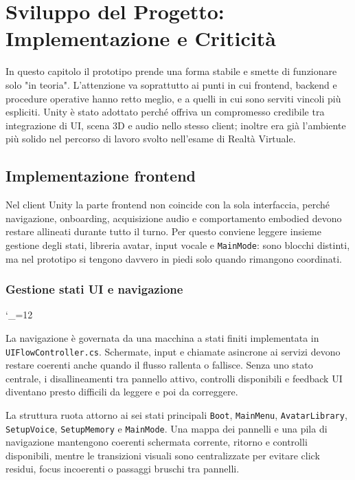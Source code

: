 \chapter{Sviluppo del Progetto: Implementazione e Criticità}
\label{chap:implementazione}



In questo capitolo il prototipo prende una forma stabile e smette di funzionare solo "in teoria". L'attenzione va soprattutto ai punti in cui frontend, backend e procedure operative hanno retto meglio, e a quelli in cui sono serviti vincoli più espliciti. Unity è stato adottato perché offriva un compromesso credibile tra integrazione di UI, scena 3D e audio nello stesso client; inoltre era già l'ambiente più solido nel percorso di lavoro svolto nell'esame di Realtà Virtuale.


\section{Implementazione frontend}
\label{sec:impl-frontend}

Nel client Unity la parte frontend non coincide con la sola interfaccia, perché navigazione, onboarding, acquisizione audio e comportamento embodied devono restare allineati durante tutto il turno. Per questo conviene leggere insieme gestione degli stati, libreria avatar, input vocale e \texttt{MainMode}: sono blocchi distinti, ma nel prototipo si tengono davvero in piedi solo quando rimangono coordinati.

\subsection{Gestione stati UI e navigazione} \label{subsec:ui-states}
\begingroup
\setlength{\emergencystretch}{3em}
\hfuzz=200pt
\sloppy
\catcode`\_=12\relax

La navigazione è governata da una macchina a stati finiti implementata in \texttt{UIFlowController.cs}. Schermate, input e chiamate asincrone ai servizi devono restare coerenti anche quando il flusso rallenta o fallisce. Senza uno stato centrale, i disallineamenti tra pannello attivo, controlli disponibili e feedback UI diventano presto difficili da leggere e poi da correggere.

La struttura ruota attorno ai sei stati principali \texttt{Boot}, \texttt{MainMenu}, \texttt{AvatarLibrary}, \texttt{SetupVoice}, \texttt{SetupMemory} e \texttt{MainMode}. Una mappa dei pannelli e una pila di navigazione mantengono coerenti schermata corrente, ritorno e controlli disponibili, mentre le transizioni visuali sono centralizzate per evitare click residui, focus incoerenti o passaggi bruschi tra pannelli.

